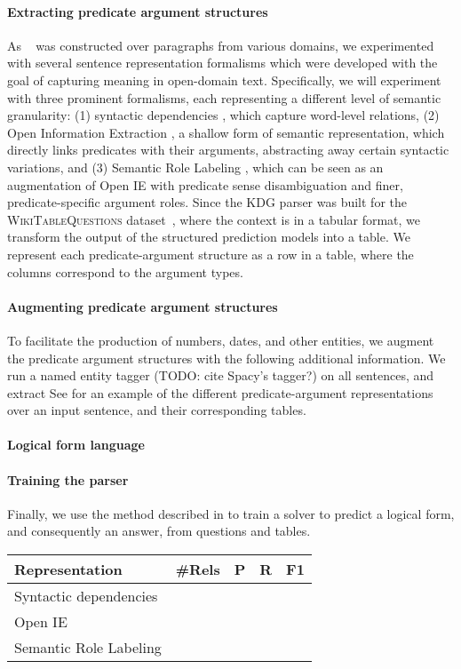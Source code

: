\paragraph{Extracting predicate argument structures} As \drop~ was constructed over paragraphs from various domains,
we experimented with several sentence representation formalisms which were
developed with the goal of capturing meaning in open-domain text.
Specifically, we will experiment with three prominent formalisms, each
representing a different level of semantic granularity:
(1) syntactic dependencies \cite{Marneffe2008TheST}, which capture word-level relations,
(2) Open Information Extraction \citep[Open IE]{Banko2007OpenIE}, a shallow
form of semantic representation, which directly links predicates
with their arguments, abstracting away certain syntactic variations, and
(3) Semantic Role Labeling \citep[SRL]{SRL}, which can be seen as an
augmentation of Open IE with predicate sense disambiguation and finer, predicate-specific
argument roles. Since the KDG parser was built for
the \textsc{WikiTableQuestions} dataset~\cite{Pasupat2015CompositionalSP},
where the context is in a tabular format, 
we transform the output of the structured prediction models into a table.
We represent each predicate-argument structure as a row in a table, where the columns correspond
to the argument types.

\paragraph{Augmenting predicate argument structures} To facilitate the production of numbers, dates, and
other entities, we augment the predicate argument structures with the following additional information.
We run a named entity tagger (TODO: cite Spacy's tagger?) on all sentences, and extract  
See  for an example of the different predicate-argument
representations over an input sentence, and their corresponding tables.

\paragraph{Logical form language}

\paragraph{Training the parser}
Finally, we use the method described in \cite{Krishnamurthy2017neuralsp}
to train a solver to predict a logical form, and consequently an answer, from questions and tables.

\begin{table}[]
\begin{tabular}{@{}lllll@{}}
\toprule
Representation         & \#Rels & P & R & F1 \\ \midrule
Syntactic dependencies &             &           &        &    \\
Open IE                &             &           &        &    \\
Semantic Role Labeling  &             &           &        &    \\ \bottomrule
\end{tabular}
\end{table}
